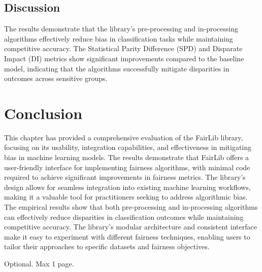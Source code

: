 \documentclass[12pt,a4paper,openright,twoside]{book}
\begin{document}

\subsection{Discussion}
The results demonstrate that the library's pre-processing and in-processing algorithms effectively reduce bias in classification tasks while maintaining competitive accuracy. The Statistical Parity Difference (SPD) and Disparate Impact (DI) metrics show significant improvements compared to the baseline model, indicating that the algorithms successfully mitigate disparities in outcomes across sensitive groups.


\section{Conclusion}
This chapter has provided a comprehensive evaluation of the FairLib library, focusing on its usability, integration capabilities, and effectiveness in mitigating bias in machine learning models. The results demonstrate that FairLib offers a user-friendly interface for implementing fairness algorithms, with minimal code required to achieve significant improvements in fairness metrics. The library's design allows for seamless integration into existing machine learning workflows, making it a valuable tool for practitioners seeking to address algorithmic bias. The empirical results show that both pre-processing and in-processing algorithms can effectively reduce disparities in classification outcomes while maintaining competitive accuracy. The library's modular architecture and consistent interface make it easy to experiment with different fairness techniques, enabling users to tailor their approaches to specific datasets and fairness objectives.





\backmatter

\nocite{*} %




\begin{acknowledgements} %
Optional. Max 1 page.
\end{acknowledgements}
\end{document}
